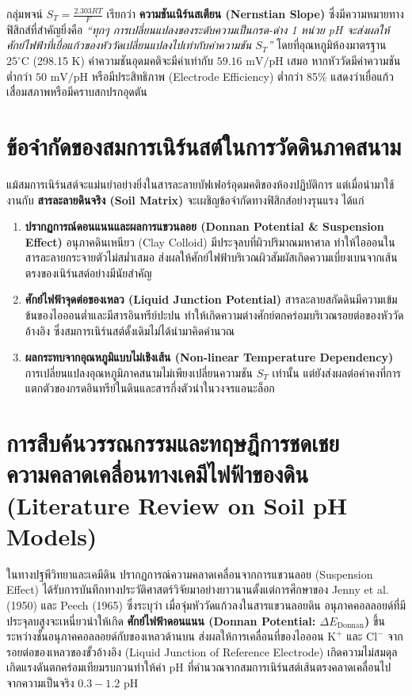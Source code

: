 \documentclass[12pt,a4paper,oneside]{report}
\begin{document}
กลุ่มพจน์ $S_T = \frac{2.303 R T}{F}$ เรียกว่า \textbf{ความชันเนิร์นสเตียน (Nernstian Slope)} ซึ่งมีความหมายทางฟิสิกส์ที่สำคัญยิ่งคือ \textit{``ทุกๆ การเปลี่ยนแปลงของระดับความเป็นกรด-ด่าง 1 หน่วย pH จะส่งผลให้ศักย์ไฟฟ้าที่เยื่อแก้วของหัววัดเปลี่ยนแปลงไปเท่ากับค่าความชัน $S_T$''} โดยที่อุณหภูมิห้องมาตรฐาน $25^\circ\text{C}$ (298.15 K) ค่าความชันอุดมคติจะมีค่าเท่ากับ $59.16\text{ mV/pH}$ เสมอ หากหัววัดมีค่าความชันต่ำกว่า $50\text{ mV/pH}$ หรือมีประสิทธิภาพ (Electrode Efficiency) ต่ำกว่า 85\% แสดงว่าเยื่อแก้วเสื่อมสภาพหรือมีคราบสกปรกอุดตัน

\section{ข้อจำกัดของสมการเนิร์นสต์ในการวัดดินภาคสนาม}
แม้สมการเนิร์นสต์จะแม่นยำอย่างยิ่งในสารละลายบัฟเฟอร์อุดมคติของห้องปฏิบัติการ แต่เมื่อนำมาใช้งานกับ \textbf{สารละลายดินจริง (Soil Matrix)} จะเผชิญข้อจำกัดทางฟิสิกส์อย่างรุนแรง ได้แก่
\begin{enumerate}
    \item \textbf{ปรากฏการณ์ดอนแนนและผลการแขวนลอย (Donnan Potential \& Suspension Effect)} อนุภาคดินเหนียว (Clay Colloid) มีประจุลบที่ผิวปริมาณมหาศาล ทำให้ไอออนในสารละลายกระจายตัวไม่สม่ำเสมอ ส่งผลให้ศักย์ไฟฟ้าบริเวณผิวสัมผัสเกิดความเบี่ยงเบนจากเส้นตรงของเนิร์นสต์อย่างมีนัยสำคัญ
    \item \textbf{ศักย์ไฟฟ้าจุดต่อของเหลว (Liquid Junction Potential)} สารละลายสกัดดินมีความเข้มข้นของไอออนต่ำและมีสารอินทรีย์ปะปน ทำให้เกิดความต่างศักย์ตกคร่อมบริเวณรอยต่อของหัววัดอ้างอิง ซึ่งสมการเนิร์นสต์ดั้งเดิมไม่ได้นำมาคิดคำนวณ
    \item \textbf{ผลกระทบจากอุณหภูมิแบบไม่เชิงเส้น (Non-linear Temperature Dependency)} การเปลี่ยนแปลงอุณหภูมิภาคสนามไม่เพียงเปลี่ยนความชัน $S_T$ เท่านั้น แต่ยังส่งผลต่อค่าคงที่การแตกตัวของกรดอินทรีย์ในดินและสารกึ่งตัวนำในวงจรแอนะล็อก
\end{enumerate}

\section{การสืบค้นวรรณกรรมและทฤษฎีการชดเชยความคลาดเคลื่อนทางเคมีไฟฟ้าของดิน (Literature Review on Soil pH Models)}
ในทางปฐพีวิทยาและเคมีดิน ปรากฏการณ์ความคลาดเคลื่อนจากการแขวนลอย (Suspension Effect) ได้รับการบันทึกทางประวัติศาสตร์วิจัยมาอย่างยาวนานตั้งแต่การศึกษาของ Jenny et al. (1950) และ Peech (1965) ซึ่งระบุว่า เมื่อจุ่มหัววัดแก้วลงในสารแขวนลอยดิน อนุภาคคอลลอยด์ที่มีประจุลบสูงจะเหนี่ยวนำให้เกิด \textbf{ศักย์ไฟฟ้าดอนแนน (Donnan Potential: $\Delta E_{\text{Donnan}}$)} ขึ้นระหว่างชั้นอนุภาคคอลลอยด์กับของเหลวด้านบน ส่งผลให้การเคลื่อนที่ของไอออน $\text{K}^+$ และ $\text{Cl}^-$ จากรอยต่อของเหลวของขั้วอ้างอิง (Liquid Junction of Reference Electrode) เกิดความไม่สมดุล เกิดแรงดันตกคร่อมเทียมรบกวนทำให้ค่า pH ที่คำนวณจากสมการเนิร์นสต์เส้นตรงคลาดเคลื่อนไปจากความเป็นจริง $0.3 - 1.2\text{ pH}$
\end{document}
